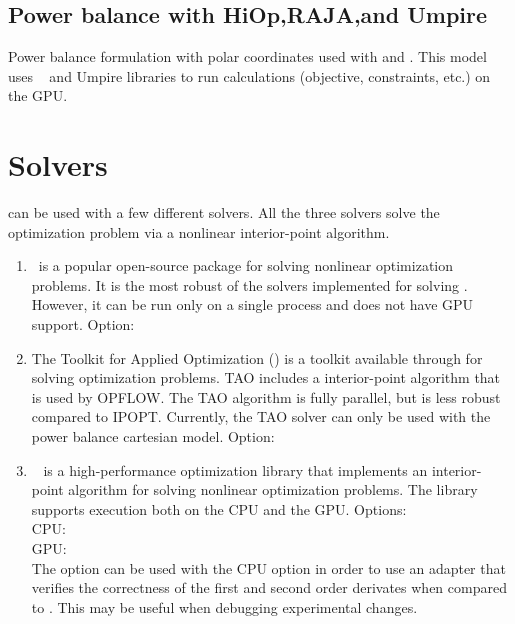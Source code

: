 \subsection{Power balance with HiOp,RAJA,and Umpire}
Power balance formulation with polar coordinates used with \hiop and \raja. This model uses \raja~\cite{beckingsale2019raja} and Umpire \cite{beckingsale2019umpire} libraries to run \opflow calculations (objective, constraints, etc.) on the GPU. 

\section{Solvers}\label{sec:opflow_solvers}
\opflow can be used with a few different solvers. All the three solvers solve the optimization problem via a nonlinear interior-point algorithm.
\begin{enumerate}
  \item \ipopt~is a popular open-source package for solving nonlinear optimization problems. It is the most robust of the solvers implemented for solving \opflow. However, it can be run only on a single process and does not have GPU support. Option: \\
  \item The Toolkit for Applied Optimization (\tao) is a toolkit available through \petsc for solving optimization problems. TAO includes a interior-point algorithm that is used by OPFLOW. The TAO algorithm is fully parallel, but is less robust compared to IPOPT. Currently, the TAO solver can only be used with the power balance cartesian model. Option:\\  
  \item \hiop~ is a high-performance optimization library that implements an interior-point algorithm for solving nonlinear optimization problems. The library supports execution both on the CPU and the GPU. Options: \\ CPU:  {} \\ GPU:  {} \\ The option  can be used with the CPU option in order to use an adapter that verifies the correctness of the first and second order derivates when compared to \ipopt. This may be useful when debugging experimental changes.
\end{enumerate}

